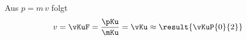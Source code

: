 Aus $p = m\,v$ folgt
\begin{align}
 v &= \vKuF = \frac{\pKu}{\mKu} = \vKu \approx \result{\vKuP{0}{2}}
\end{align}
